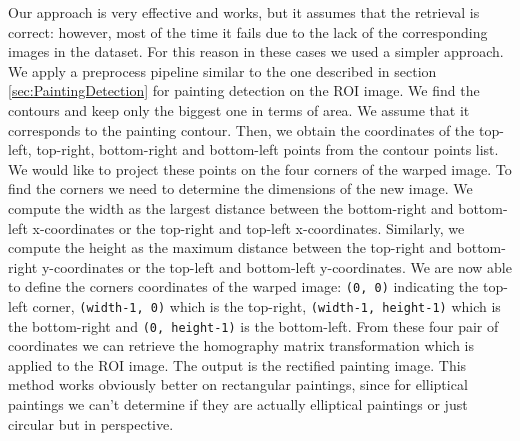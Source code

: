 \documentclass[10pt,twocolumn,letterpaper]{article}
\begin{document}
Our approach is very effective and works, but it assumes that the retrieval is correct: however, most of the time it fails due to the lack of the corresponding images in the dataset. For this reason in these cases we used a simpler approach.
We apply a preprocess pipeline similar to the one described in section \ref{sec:PaintingDetection} for painting detection on the ROI image. We find the contours and keep only the biggest one in terms of area. We assume that it corresponds to the painting contour. Then, we obtain the coordinates of the top-left, top-right, bottom-right and bottom-left points from the contour points list. 
We would like to project these points on the four corners of the warped image. To find the corners we need to determine the dimensions of the new image. We compute the width as the largest distance between the bottom-right and bottom-left x-coordinates or the top-right and top-left x-coordinates. Similarly, we compute the height as the maximum distance between the top-right and bottom-right y-coordinates or the top-left and bottom-left y-coordinates.  
We are now able to define the corners coordinates of the warped image: \texttt{(0, 0)} indicating the top-left corner, \texttt{(width-1, 0)} which is the top-right, \texttt{(width-1, height-1)} which is the bottom-right and \texttt{(0, height-1)} is the bottom-left.
From these four pair of coordinates we can retrieve the homography matrix transformation which is applied to the ROI image. The output is the rectified painting image.
This method works obviously better on rectangular paintings, since for elliptical paintings we can't determine if they are actually elliptical paintings or just circular but in perspective.
\end{document}
